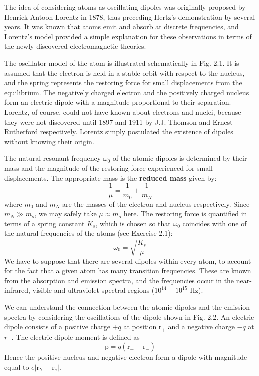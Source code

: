\documentclass[12pt]{book}
\begin{document}
The idea of considering atoms as oscillating dipoles was originally proposed by Henrick Antoon Lorentz in 1878, thus preceding Hertz's demonstration by several years. It was known that atoms emit and absorb at discrete frequencies, and Lorentz's model provided a simple explanation for these observations in terms of the newly discovered electromagnetic theories.

The oscillator model of the atom is illustrated schematically in Fig. 2.1. It is assumed that the electron is held in a stable orbit with respect to the nucleus, and the spring represents the restoring force for small displacements from the equilibrium. The negatively charged electron and the positively charged nucleus form an electric dipole with a magnitude proportional to their  separation. Lorentz, of course, could not have known about electrons and nuclei, because they were not discovered until 1897 and 1911 by J.J. Thomson and Ernest Rutherford respectively. Lorentz simply postulated the existence of dipoles without knowing their origin.

The natural resonant frequency $\omega_0$ of the atomic dipoles is determined by their mass and the magnitude of the restoring force experienced for small displacements. The appropriate mass is the \textbf{reduced mass} given by:
\begin{equation}\label{equa:2.1}
  \frac{1}{\mu}=\frac{1}{m_0}+\frac{1}{m_N}
\end{equation}
where $m_0$ and $m_N$ are the masses of the electron and nucleus respectively. Since $m_N\gg m_o$, we may safely take $\mu \approx m_o$ here. The restoring force is quantified in terms of a spring constant $K_s$, which is chosen so that $\omega_0$ coincides with one of the natural frequencies of the atoms (see Exercise 2.1):
\begin{equation}\label{equa:2.2}
  \omega_0=\sqrt{\frac{K_s}{\mu}}
\end{equation}
We have to suppose that there are several dipoles within every atom, to account for the fact that a given atom has many transition frequencies. These are known from the absorption and emission spectra, and the frequencies occur in the near-infrared, visible and ultraviolet spectral regions ($10^{14}-10^{15}$ Hz).

We can understand the connection between the atomic dipoles and the emission spectra by considering the oscillations of the dipole shown in Fig. 2.2. An electric dipole consists of a positive charge $+q$ at position $\mathrm{r}_{+}$ and a negative charge $-q$ at $r_{-}$. The electric dipole moment is defined as
\begin{equation}\label{equa:2.3}
  \mathrm{p}=q(\mathrm{r}_{+}-\mathrm{r}_{-})
\end{equation}
Hence the positive nucleus and negative electron form a dipole with magnitude equal to $e|\mathrm{r_N}-\mathrm{r}_e|$.
\end{document}
